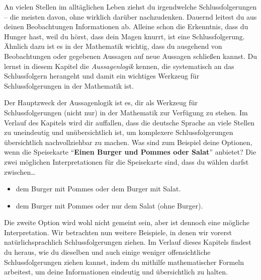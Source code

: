 \documentclass[../../main.tex]{subfiles}
\newcommand{\statement}[1]{\textrm{ \enquote{\textbf{#1}}}}
\begin{document}

    An vielen Stellen im alltäglichen Leben ziehst du irgendwelche Schlussfolgerungen -- die meisten davon, ohne wirklich darüber nachzudenken. Dauernd leitest du aus deinen Beobachtungen Informationen ab. Alleine schon die Erkenntnis, dass du Hunger hast, weil du hörst, dass dein Magen knurrt, ist eine Schlussfolgerung. Ähnlich dazu ist es in der Mathematik wichtig, dass du ausgehend von Beobachtungen oder gegebenen Aussagen auf neue Aussagen schließen kannst. Du lernst in diesem Kapitel die \emph{Aussagenlogik} kennen, die systematisch an das Schlussfolgern herangeht und damit ein wichtiges Werkzeug für Schlussfolgerungen in der Mathematik ist.
    
    Der Hauptzweck der Aussagenlogik ist es, dir als Werkzeug für Schlussfolgerungen (nicht nur) in der Mathematik zur Verfügung zu stehen. Im Verlauf des Kapitels wird dir auffallen, dass die deutsche Sprache an viele Stellen zu uneindeutig und unübersichtlich ist, um komplexere Schlussfolgerungen übersichtlich nachvollziehbar zu machen. Was sind zum Beispiel deine Optionen, wenn die Speisekarte  \statement{Einen Burger und Pommes oder Salat} anbietet? Die zwei möglichen Interpretationen für die Speisekarte sind, dass du wählen darfst zwischen\dots
    \begin{itemize}[label=\dots, nosep]
        \item dem Burger mit Pommes oder dem Burger mit Salat.
        \item dem Burger mit Pommes oder nur dem Salat (ohne Burger).
    \end{itemize}
    Die zweite Option wird wohl nicht gemeint sein, aber ist dennoch eine mögliche Interpretation. Wir betrachten nun weitere Beispiele, in denen wir vorerst natürlichsprachlich Schlussfolgerungen ziehen. Im Verlauf dieses Kapitels findest du heraus, wie du dieselben und auch einige weniger offensichtliche Schlussfolgerungen ziehen kannst, indem du mithilfe mathematischer Formeln arbeitest, um deine Informationen eindeutig und übersichtlich zu halten.
    
    
\end{document}
